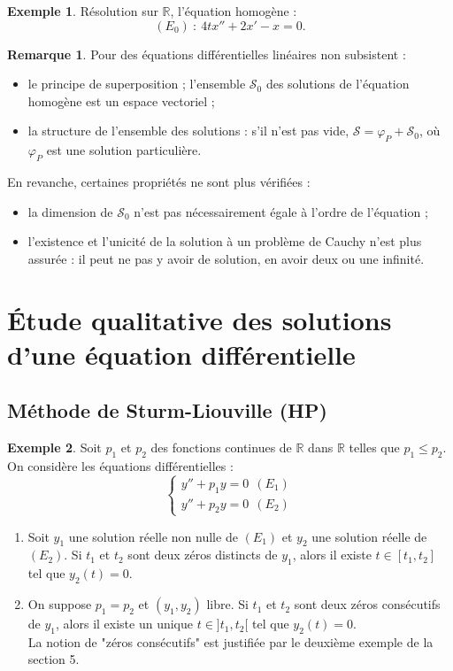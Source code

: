\documentclass[french]{article}
\newcommand{\R}{\mathbb{R}}
\theoremstyle{plain}
\theoremstyle{definition}
\newtheorem*{ex}{Exemple}
\newtheorem*{rmq}{Remarque}
\theoremstyle{remark}
\begin{document}
\begin{ex}
	Résolution sur $\R$, l'équation homogène :
	$$(E_0)\ :\ 4tx''+2x'-x=0.$$
\end{ex}

\begin{rmq}
	Pour des équations différentielles linéaires non subsistent :
	\begin{itemize}
		\item le principe de superposition ;
		l'ensemble $\mathcal{S}_0$ des solutions de l'équation homogène est un espace vectoriel ;
		\item la structure de l'ensemble des solutions : s'il n'est pas vide, $\mathcal{S}=\varphi_P+\mathcal{S}_0$, où $\varphi_P$ est une solution particulière.
	\end{itemize}
	En revanche, certaines propriétés ne sont plus vérifiées :
	\begin{itemize}
		\item la dimension de $\mathcal{S}_0$ n'est pas nécessairement égale à l'ordre de l'équation ;
		\item l'existence et l'unicité de la solution à un problème de Cauchy n'est plus assurée : il peut ne pas y avoir de solution, en avoir deux ou une infinité.
	\end{itemize}
\end{rmq}

\section{Étude qualitative des solutions d'une équation différentielle}

\subsection{Méthode de Sturm-Liouville (HP)}

\begin{ex}
	Soit $p_1$ et $p_2$ des fonctions continues de $\R$ dans $\R$ telles que $p_1\leqslant p_2$. On considère les équations différentielles : $$\begin{cases}
		y''+p_1y=0 \ \ (E_1) \\
		y''+p_2y=0 \ \ (E_2)
	\end{cases}$$
	\begin{enumerate}
		\item Soit $y_1$ une solution réelle non nulle de $(E_1)$ et $y_2$ une solution réelle de $(E_2)$. Si $t_1$ et $t_2$ sont deux zéros distincts de $y_1$, alors il existe $t\in[t_1,t_2]$ tel que $y_2(t)=0$.
		\item On suppose $p_1=p_2$ et $(y_1,y_2)$ libre. Si $t_1$ et $t_2$ sont deux zéros consécutifs de $y_1$, alors il existe un unique $t\in]t_1,t_2[$ tel que $y_2(t)=0$. \\
		La notion de "zéros consécutifs" est justifiée par le deuxième exemple de la section 5.
	\end{enumerate}
\end{ex}
\end{document}
